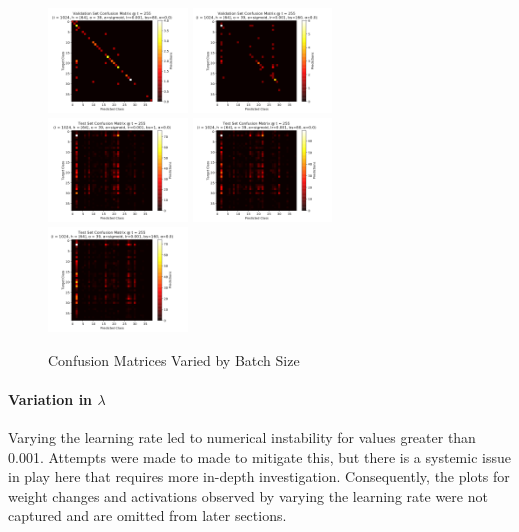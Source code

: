 \documentclass[10pt,epsf]{article}
\begin{document}
{{\begin{figure}[H]
      \includegraphics[width=0.33\textwidth]{./img/64-0.001-80-0-sigmoid-1/confusion-matrix-validation-255.png}
      \includegraphics[width=0.33\textwidth]{./img/64-0.001-160-0-sigmoid-1/confusion-matrix-validation-255.png}
      \includegraphics[width=0.33\textwidth]{./img/64-0.001-1-0-sigmoid-1/confusion-matrix-test-255.png}
      \includegraphics[width=0.33\textwidth]{./img/64-0.001-80-0-sigmoid-1/confusion-matrix-test-255.png}
      \includegraphics[width=0.33\textwidth]{./img/64-0.001-160-0-sigmoid-1/confusion-matrix-test-255.png}
      \caption{Confusion Matrices Varied by Batch Size}
      \label{fig:cm-by-b}
    \end{figure}
    \paragraph{Variation in $\lambda$}{
      Varying the learning rate led to numerical instability for values greater than 0.001.
      Attempts were made to made to mitigate this, but there is a systemic issue in play here
      that requires more in-depth investigation. Consequently, the plots for weight changes
      and activations observed by varying the learning rate were not captured and are omitted
      from later sections.

}}}
\end{document}
